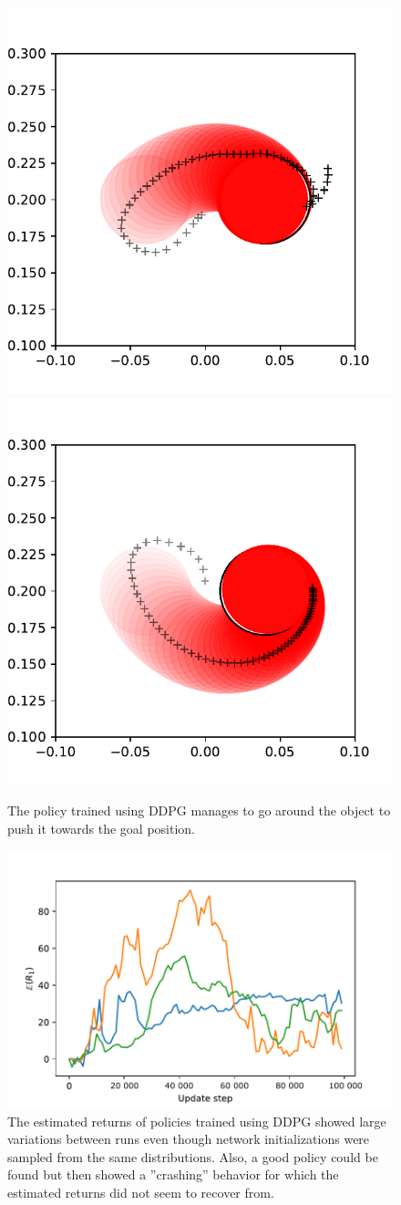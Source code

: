 \begin{figure}[h!]
    \centering
    \includegraphics[width=0.49 \textwidth]{res/ddpg-sim-pushing-series1.pdf}
    \includegraphics[width=0.49 \textwidth]{res/ddpg-sim-pushing-series2.pdf}

    \caption{The policy trained using DDPG manages to go around the object to
    push it towards the goal position.}

    \label{fig:ddpg-sim-pushing-series}

\end{figure}

\begin{figure}[h!]
    \centering
    \includegraphics[width=0.6 \textwidth]{res/ddpg-pushing-sim-several-runs.pdf}

    \caption{The estimated returns of policies trained using DDPG showed large
    variations between runs even though network initializations were sampled
    from the same distributions. Also, a good policy could be found but then
    showed a ''crashing'' behavior for which the estimated returns did not seem
    to recover from.}

    \label{fig:ddpg-sim-pushing-returns}

\end{figure}
